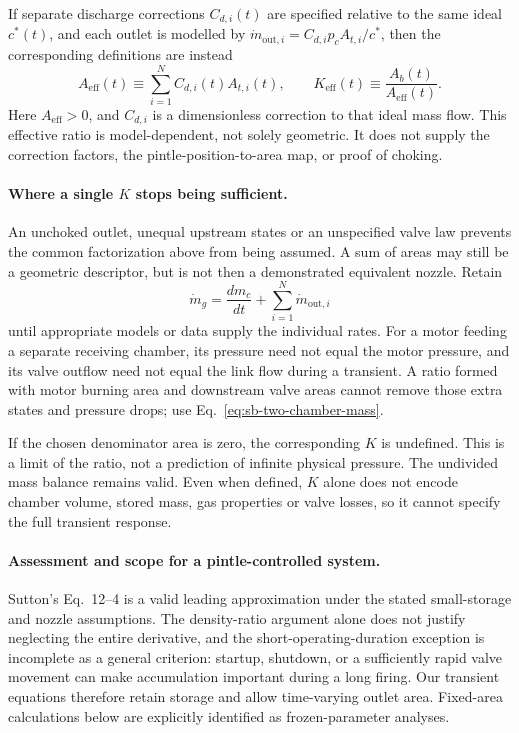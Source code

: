 If separate discharge corrections $C_{d,i}(t)$ are specified relative
to the same ideal $c^*(t)$, and each outlet is modelled by
$\dot m_{\mathrm{out},i}=C_{d,i}p_cA_{t,i}/c^*$, then the corresponding
definitions are instead
\[
 A_{\mathrm{eff}}(t)
 \equiv\sum_{i=1}^{N}C_{d,i}(t)A_{t,i}(t),\qquad
 K_{\mathrm{eff}}(t)\equiv\frac{A_b(t)}{A_{\mathrm{eff}}(t)}.
\]
Here $A_{\mathrm{eff}}>0$, and $C_{d,i}$ is a dimensionless correction
to that ideal mass flow. This effective ratio is model-dependent,
not solely geometric. It does not supply the correction factors,
the pintle-position-to-area map, or proof of choking.

\paragraph{Where a single $K$ stops being sufficient.}
An unchoked outlet, unequal upstream states or an unspecified valve
law prevents the common factorization above from being assumed.
A sum of areas may still be a geometric descriptor, but is not then
a demonstrated equivalent nozzle. Retain
\[
 \dot m_g=\frac{dm_c}{dt}+\sum_{i=1}^{N}\dot m_{\mathrm{out},i}
\]
until appropriate models or data supply the individual rates.
For a motor feeding a separate receiving chamber, its pressure need
not equal the motor pressure, and its valve outflow need not equal
the link flow during a transient. A ratio formed with motor burning
area and downstream valve areas cannot remove those extra states
and pressure drops; use Eq.~\eqref{eq:sb-two-chamber-mass}.

If the chosen denominator area is zero, the corresponding $K$ is
undefined. This is a limit of the ratio, not a prediction of infinite
physical pressure. The undivided mass balance remains valid.
Even when defined, $K$ alone does not encode chamber volume, stored
mass, gas properties or valve losses, so it cannot specify the full
transient response.


\paragraph{Assessment and scope for a pintle-controlled system.}
Sutton's Eq.~12--4 is a valid leading approximation under the stated
small-storage and nozzle assumptions. The density-ratio argument
alone does not justify neglecting the entire derivative, and the
short-operating-duration exception is incomplete as a general
criterion: startup, shutdown, or a sufficiently rapid valve movement
can make accumulation important during a long firing.
Our transient equations therefore retain storage and allow time-varying
outlet area. Fixed-area calculations below are explicitly identified
as frozen-parameter analyses.


